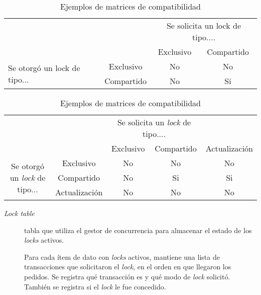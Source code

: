 \documentclass[a4paper, twoside]{article}
\begin{document}
\begin{table}[H]
	\centering
	\begin{subtable}{0.9\textwidth}
		\centering
		\begin{tabular}{|l|c|c|c|}
			\cline{3-4} 
			\multicolumn{1}{l}{} &  & \multicolumn{2}{c|}{Se solicita un lock de tipo....}\\
			\cline{3-4} 
			\multicolumn{1}{l}{} &  & Exclusivo & Compartido\\
			\hline 
			\multirow{2}{*}{Se otorgó un lock de tipo...} & Exclusivo & No & No\\
			\cline{2-4} 
			 & Compartido & No & Si\\
			\hline 
		\end{tabular}
		\caption{Para locks compartidos y exclusivos}
	\end{subtable}

	\begin{subtable}{0.9\textwidth}
		\centering
		\begin{tabular}{|c|c|c|c|c|}
			\cline{3-5} 
			\multicolumn{1}{c}{} &  & \multicolumn{2}{c}{Se solicita un \emph{lock} de tipo....} & \\
			\cline{3-5} 
			\multicolumn{1}{c}{} &  & Exclusivo & Compartido & Actualización\\
			\hline 
			\multirow{3}{*}{Se otorgó un \emph{lock} de tipo...} & Exclusivo & No & No & No\\
			\cline{2-5} 
			 & Compartido & No & Si & Si\\
			\cline{2-5} 
			 & Actualización & No & No & No\\
			\hline 
		\end{tabular}
		\caption{Para locks compartidos, exclusivos y de actualización}
	\end{subtable}
	\caption{Ejemplos de matrices de compatibilidad}
\end{table}

\begin{description}
	\item[\emph{Lock table}] tabla que utiliza el gestor de concurrencia para almacenar el estado de los \emph{locks} activos.

	Para cada ítem de dato con \emph{locks} activos, mantiene una lista de transacciones que solicitaron el \emph{lock}, en el orden en que llegaron los pedidos. Se registra qué transacción es y qué modo de \emph{lock} solicitó. También se registra si el \emph{lock} le fue concedido.
\end{description}
\end{document}
